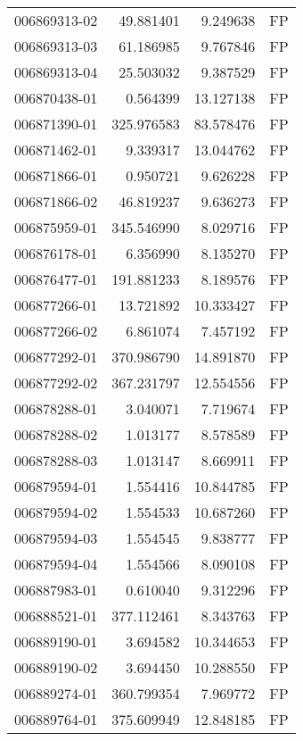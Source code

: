 \begin{tabular}{lrrl}
006869313-02 &   49.881401 &       9.249638 &   FP \\
006869313-03 &   61.186985 &       9.767846 &   FP \\
006869313-04 &   25.503032 &       9.387529 &   FP \\
006870438-01 &    0.564399 &      13.127138 &   FP \\
006871390-01 &  325.976583 &      83.578476 &   FP \\
006871462-01 &    9.339317 &      13.044762 &   FP \\
006871866-01 &    0.950721 &       9.626228 &   FP \\
006871866-02 &   46.819237 &       9.636273 &   FP \\
006875959-01 &  345.546990 &       8.029716 &   FP \\
006876178-01 &    6.356990 &       8.135270 &   FP \\
006876477-01 &  191.881233 &       8.189576 &   FP \\
006877266-01 &   13.721892 &      10.333427 &   FP \\
006877266-02 &    6.861074 &       7.457192 &   FP \\
006877292-01 &  370.986790 &      14.891870 &   FP \\
006877292-02 &  367.231797 &      12.554556 &   FP \\
006878288-01 &    3.040071 &       7.719674 &   FP \\
006878288-02 &    1.013177 &       8.578589 &   FP \\
006878288-03 &    1.013147 &       8.669911 &   FP \\
006879594-01 &    1.554416 &      10.844785 &   FP \\
006879594-02 &    1.554533 &      10.687260 &   FP \\
006879594-03 &    1.554545 &       9.838777 &   FP \\
006879594-04 &    1.554566 &       8.090108 &   FP \\
006887983-01 &    0.610040 &       9.312296 &   FP \\
006888521-01 &  377.112461 &       8.343763 &   FP \\
006889190-01 &    3.694582 &      10.344653 &   FP \\
006889190-02 &    3.694450 &      10.288550 &   FP \\
006889274-01 &  360.799354 &       7.969772 &   FP \\
006889764-01 &  375.609949 &      12.848185 &   FP \\

\end{tabular}
